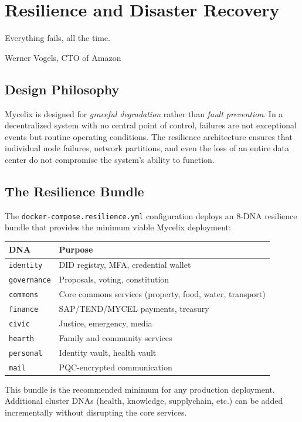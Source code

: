 \documentclass[12pt]{book}
\begin{document}
\chapter{Resilience and Disaster Recovery}
\label{ch:resilience}

\epigraph{Everything fails, all the time.}{Werner Vogels, CTO of Amazon}

\section{Design Philosophy}

Mycelix is designed for \emph{graceful degradation} rather than
\emph{fault prevention}.  In a decentralized system with no central
point of control, failures are not exceptional events but routine
operating conditions.  The resilience architecture ensures that
individual node failures, network partitions, and even the loss of
an entire data center do not compromise the system's ability to
function.

\section{The Resilience Bundle}

The \texttt{docker-compose.resilience.yml} configuration deploys an
8-DNA resilience bundle that provides the minimum viable Mycelix
deployment:

\begin{longtable}{lp{8cm}}
\toprule
\textbf{DNA} & \textbf{Purpose} \\
\midrule
\endhead
\texttt{identity}   & DID registry, MFA, credential wallet \\
\texttt{governance}  & Proposals, voting, constitution \\
\texttt{commons}     & Core commons services (property, food, water, transport) \\
\texttt{finance}     & SAP/TEND/MYCEL payments, treasury \\
\texttt{civic}       & Justice, emergency, media \\
\texttt{hearth}      & Family and community services \\
\texttt{personal}    & Identity vault, health vault \\
\texttt{mail}        & PQC-encrypted communication \\
\bottomrule
\end{longtable}

This bundle is the recommended minimum for any production deployment.
Additional cluster DNAs (health, knowledge, supplychain, etc.) can be
added incrementally without disrupting the core services.
\end{document}
